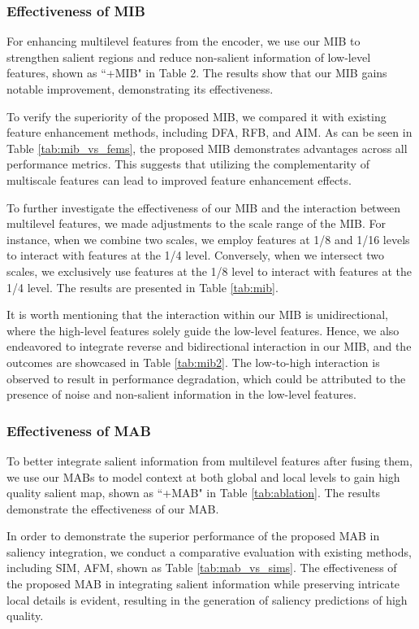 \documentclass[lettersize,journal]{IEEEtran}
\begin{document}
\subsubsection{Effectiveness of MIB} 
For enhancing multilevel features from the encoder, we use our MIB to strengthen salient regions and reduce non-salient information of low-level features, shown as ``+MIB" in Table 2. The results show that our MIB gains notable improvement, demonstrating its effectiveness. 

To verify the superiority of the proposed MIB, 
we compared it with existing feature enhancement methods, 
including DFA\cite{ICON}, RFB\cite{Liu_2018_ECCV}, and AIM\cite{MiNet}. 
As can be seen in Table \ref{tab:mib_vs_fems}, 
the proposed MIB demonstrates advantages across all performance metrics. 
This suggests that utilizing the complementarity of multiscale features can lead to improved feature enhancement effects. 

To further investigate the effectiveness of our MIB and
the interaction between multilevel features, we made adjustments to the scale range of the MIB. 
For instance, when we combine two scales, we employ features at 1/8 and 1/16 levels to interact with features at the 1/4 level. 
Conversely, when we intersect two scales, we exclusively use features at the 1/8 level to interact with features at the 1/4 level. 
The results are presented in Table \ref{tab:mib}. 

It is worth mentioning that the interaction within our MIB is unidirectional, 
where the high-level features solely guide the low-level features. 
Hence, we also endeavored to integrate reverse and bidirectional interaction in our MIB, 
and the outcomes are showcased in Table \ref{tab:mib2}. 
The low-to-high interaction is observed to result in performance degradation, 
which could be attributed to the presence of noise and non-salient information in the low-level features. 



\subsubsection{Effectiveness of MAB}
To better integrate salient information from multilevel features after fusing them, we use our MABs to model context at both global and local levels to gain high quality salient map, shown as ``+MAB" in Table \ref{tab:ablation}. The results demonstrate the effectiveness of our MAB. 

In order to demonstrate the superior performance of the proposed MAB 
in saliency integration, we conduct a comparative evaluation with existing methods, 
including SIM\cite{MiNet}, AFM\cite{Ma_Xia_Li_2021}, shown as Table \ref{tab:mab_vs_sims}. 
The effectiveness of the proposed MAB in integrating salient information while preserving intricate local details is evident, resulting in the generation of saliency predictions of high quality.
\end{document}
